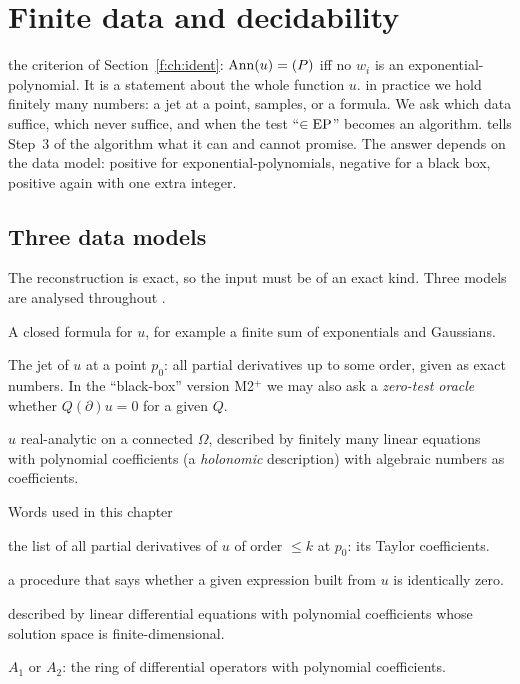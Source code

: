 \section{Finite data and decidability}\label{f:ch:data}
\sectionbrief
{the criterion of Section~\ref{f:ch:ident}: $\operatorname{Ann}(u)=(P)$ iff no $w_i$ is an exponential-polynomial. It is a statement about the whole function $u$.}
{in practice we hold finitely many numbers: a jet at a point, samples, or a formula. We ask which data suffice, which never suffice, and when the test ``$\in\mathrm{EP}$'' becomes an algorithm.}
{tells Step~3 of the algorithm what it can and cannot promise. The answer depends on the data model: positive for exponential-polynomials, negative for a black box, positive again with one extra integer.}

\subsection{Three data models}

The reconstruction is exact, so the input must be of an exact kind. Three models are analysed throughout .

\begin{description}[leftmargin=1.4cm,labelwidth=1.1cm,font=\sffamily\bfseries]
\item[M1] A closed formula for $u$, for example a finite sum of exponentials and Gaussians.
\item[M2] The jet of $u$ at a point $p_0$: all partial derivatives up to some order, given as exact numbers. In the ``black-box'' version M2$^+$ we may also ask a \emph{zero-test oracle} whether $Q(\partial)u=0$ for a given $Q$.
\item[M3] $u$ real-analytic on a connected $\Omega$, described by finitely many linear equations with polynomial coefficients (a \emph{holonomic} description) with algebraic numbers as coefficients.
\end{description}

\begin{notebox}{Words used in this chapter}
\begin{description}[leftmargin=3.3cm,labelwidth=3.1cm]
\item[Jet of order $k$] the list of all partial derivatives of $u$ of order $\le k$ at $p_0$: its Taylor coefficients.
\item[Zero-test oracle] a procedure that says whether a given expression built from $u$ is identically zero.
\item[Holonomic] described by linear differential equations with polynomial coefficients whose solution space is finite-dimensional.
\item[Weyl algebra] $A_1$ or $A_2$: the ring of differential operators with polynomial coefficients.
\end{description}
\end{notebox}

